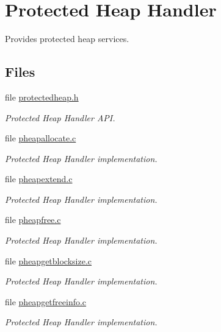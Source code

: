 \hypertarget{group__RTEMSScoreProtHeap}{}\section{Protected Heap Handler}
\label{group__RTEMSScoreProtHeap}


Provides protected heap services.  


\subsection*{Files}
\begin{DoxyCompactItemize}
\item 
file \mbox{\hyperlink{protectedheap_8h}{protectedheap.\+h}}
\begin{DoxyCompactList}\small\item\em Protected Heap Handler A\+PI. \end{DoxyCompactList}\item 
file \mbox{\hyperlink{pheapallocate_8c}{pheapallocate.\+c}}
\begin{DoxyCompactList}\small\item\em Protected Heap Handler implementation. \end{DoxyCompactList}\item 
file \mbox{\hyperlink{pheapextend_8c}{pheapextend.\+c}}
\begin{DoxyCompactList}\small\item\em Protected Heap Handler implementation. \end{DoxyCompactList}\item 
file \mbox{\hyperlink{pheapfree_8c}{pheapfree.\+c}}
\begin{DoxyCompactList}\small\item\em Protected Heap Handler implementation. \end{DoxyCompactList}\item 
file \mbox{\hyperlink{pheapgetblocksize_8c}{pheapgetblocksize.\+c}}
\begin{DoxyCompactList}\small\item\em Protected Heap Handler implementation. \end{DoxyCompactList}\item 
file \mbox{\hyperlink{pheapgetfreeinfo_8c}{pheapgetfreeinfo.\+c}}
\begin{DoxyCompactList}\small\item\em Protected Heap Handler implementation. \end{DoxyCompactList}\item 

\end{DoxyCompactItemize}
